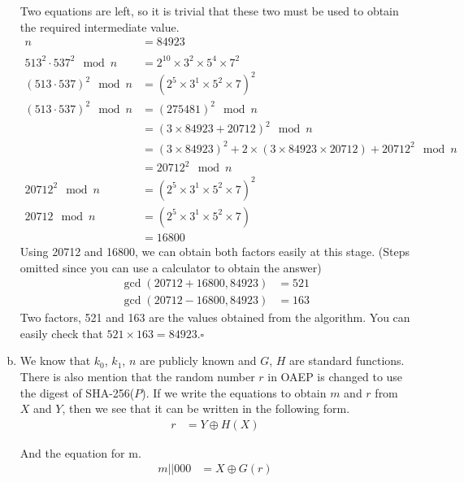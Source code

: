 \documentclass[12pt]{article}
\newcommand{\EOQ}{\hfill $\square$}
\begin{document}
\begin{enumerate}[(a)]
Two equations are left, so it is trivial that these two must be used to obtain the required intermediate value.
\begin{equation*}
\begin{split}
n&=84923\\\\
513^2\cdot 537^2\mod n&=2^{10}\times 3^2\times 5^4\times 7^2\\
(513\cdot 537)^2\mod n&=(2^{5}\times 3^1\times 5^2\times 7)^2\\
(513\cdot 537)^2\mod n&=(275481)^2\mod n\\
&=(3\times 84923+20712)^2\mod n\\
&=(3\times 84923)^2+2\times(3\times 84923\times 20712)+20712^2 \mod n\\
&=20712^2 \mod n\\
20712^2\mod n&=(2^{5}\times 3^1\times 5^2\times 7)^2\\
20712\mod n&=(2^{5}\times 3^1\times 5^2\times 7)\\
&=16800
\end{split}
\end{equation*}
Using 20712 and 16800, we can obtain both factors easily at this stage. (Steps omitted since you can use a calculator to obtain the answer)
\begin{equation*}
\begin{split}
\gcd(20712+16800,84923)&=521\\
\gcd(20712-16800,84923)&=163
\end{split}
\end{equation*}
Two factors, 521 and 163 are the values obtained from the algorithm. You can easily check that $521\times 163=84923$.\EOQ
\item We know that $k_0$, $k_1$, $n$ are publicly known and $G$, $H$ are standard functions. There is also mention that the random number $r$ in OAEP is changed to use the digest of SHA-256($P$). If we write the equations to obtain $m$ and $r$ from $X$ and $Y$, then we see that it can be written in the following form.
\begin{equation} \label{eqn1}
\begin{split}
r&=Y\oplus H(X)
\end{split}
\end{equation}

And the equation for m.
\begin{equation} \label{eqn2}
\begin{split}
m||000&=X\oplus G(r)
\end{split}
\end{equation}


\end{enumerate}
\end{document}
